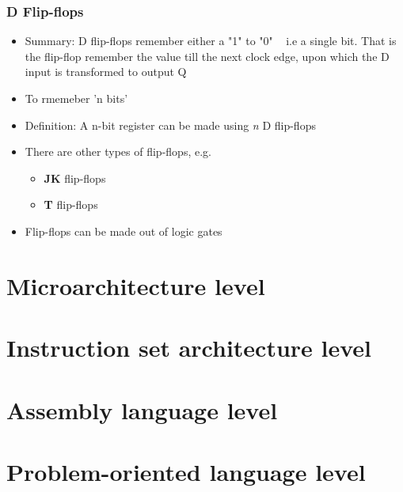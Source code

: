 \documentclass{article}
\begin{document}
\subsubsection{D Flip-flops}
\begin{itemize}
\item Summary: D flip-flops remember either a "1" to "0" ~ i.e a single bit. That is the flip-flop remember the value till the next clock edge, upon which the D input is transformed to output Q
\item To rmemeber 'n bits'
\item Definition: A n-bit register can be made using \textit{n} D flip-flops
\item There are other types of flip-flops, e.g.
\begin{itemize}
\item \textbf{JK} flip-flops
\item \textbf{T} flip-flops
\end{itemize}
\item Flip-flops can be made out of logic gates
\end{itemize}

\section{Microarchitecture level}

\section{Instruction set architecture level}

\section{Assembly language level}

\section{Problem-oriented language level}
\end{document}
